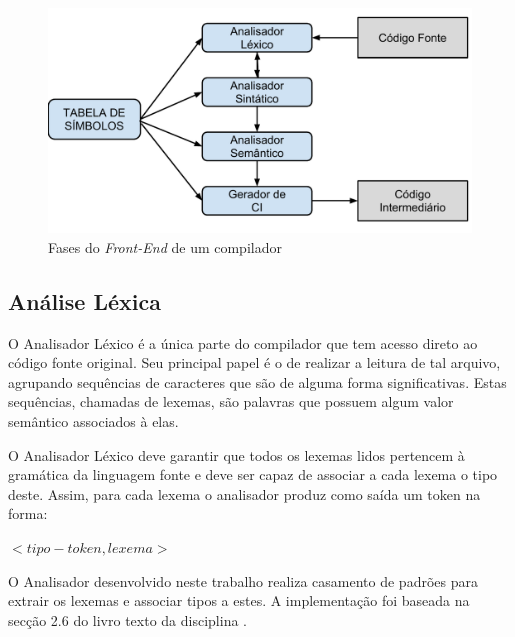 \documentclass[12pt]{article}
\begin{document}
\begin{figure}[h!]
\centering
\begin{minipage}[b]{0.77\linewidth}
\includegraphics[width=\linewidth]{frontend}
\end{minipage}

\caption{Fases do \textit{Front-End} de um compilador}
\label{fig:frontend}
\end{figure}

\subsection{Análise Léxica}

O Analisador Léxico é a única parte do compilador que tem acesso direto ao código fonte original. Seu principal papel é o de realizar a leitura de tal arquivo, agrupando sequências de caracteres que são de alguma forma significativas. Estas sequências, chamadas de lexemas, são palavras que possuem algum valor semântico associados à elas.

O Analisador Léxico deve garantir que todos os lexemas lidos pertencem à gramática da linguagem fonte e deve ser capaz de associar a cada lexema o tipo deste. Assim, para cada lexema o analisador produz como saída um token na forma:

\begin{center}{
\textit{$< tipo-token,lexema >$}}
\end{center}

O Analisador desenvolvido neste trabalho realiza casamento de padrões para extrair os lexemas e associar tipos a estes. A implementação foi baseada na secção 2.6 do livro texto da disciplina \cite{Aho:2006:CPT:1177220}.
\end{document}
